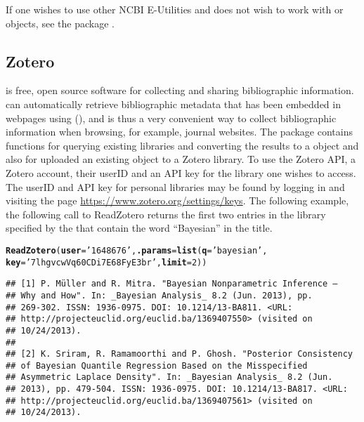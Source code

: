 \documentclass[article]{jss}\usepackage[]{graphicx}\usepackage[]{color}
\makeatletter
\newcommand{\hlnum}[1]{\textcolor[rgb]{0.125,0.125,1}{#1}}%
\newcommand{\hlstr}[1]{\textcolor[rgb]{0.125,0.125,1}{#1}}%
\newcommand{\hlstd}[1]{\textcolor[rgb]{0.251,0.251,0.282}{#1}}%
\newcommand{\hlkwc}[1]{\textcolor[rgb]{0.529,0,0.184}{\textbf{#1}}}%
\newcommand{\hlkwd}[1]{\textcolor[rgb]{0.251,0.251,0.282}{\textbf{#1}}}%
\newenvironment{kframe}{%
 \def\at@end@of@kframe{}%
 \ifinner\ifhmode%
  \def\at@end@of@kframe{\end{minipage}}%
  \begin{minipage}{\columnwidth}%
 \fi\fi%
 \def\FrameCommand##1{\hskip\@totalleftmargin \hskip-\fboxsep
 \colorbox{shadecolor}{##1}\hskip-\fboxsep
     \hskip-\linewidth \hskip-\@totalleftmargin \hskip\columnwidth}%
 \MakeFramed {\advance\hsize-\width
   \@totalleftmargin\z@ \linewidth\hsize
   \@setminipage}}%
 {\par\unskip\endMakeFramed%
 \at@end@of@kframe}
\newenvironment{knitrout}{}{} %
\newcommand{\ourpkg}{\pkg{RefManageR}}
\makeatother
\begin{document}
If one wishes to use other NCBI E-Utilities and does not wish to work with  or  objects, see the  package \citep{rentrez}.
\subsection{Zotero}
 is free, open source software for collecting and sharing bibliographic information.   can automatically retrieve bibliographic metadata that has been embedded in webpages using  (), and is thus a very convenient way to collect bibliographic information when browsing, for example, journal websites.  The \ourpkg{} package contains functions for querying existing  libraries and converting the results to a  object and also for uploaded an existing  object to a Zotero library.  To use the Zotero API, a Zotero account, their userID and an API key for the library one wishes to access.  The userID and API key for personal libraries may be found by logging in and visiting the page \url{https://www.zotero.org/settings/keys}.  The following example, the following call to ReadZotero returns the first two entries in the library specified by the  that contain the word ``Bayesian'' in the title.
\begin{knitrout}
\color{fgcolor}\begin{kframe}
\begin{alltt}
\hlkwd{ReadZotero}\hlstd{(}\hlkwc{user} \hlstd{=} \hlstr{'1648676'}\hlstd{,} \hlkwc{.params} \hlstd{=} \hlkwd{list}\hlstd{(}\hlkwc{q} \hlstd{=} \hlstr{'bayesian'}\hlstd{,}
                               \hlkwc{key} \hlstd{=} \hlstr{'7lhgvcwVq60CDi7E68FyE3br'}\hlstd{,} \hlkwc{limit} \hlstd{=} \hlnum{2}\hlstd{))}
\end{alltt}
\begin{verbatim}
## [1] P. Müller and R. Mitra. "Bayesian Nonparametric Inference –
## Why and How". In: _Bayesian Analysis_ 8.2 (Jun. 2013), pp.
## 269-302. ISSN: 1936-0975. DOI: 10.1214/13-BA811. <URL:
## http://projecteuclid.org/euclid.ba/1369407550> (visited on
## 10/24/2013).
## 
## [2] K. Sriram, R. Ramamoorthi and P. Ghosh. "Posterior Consistency
## of Bayesian Quantile Regression Based on the Misspecified
## Asymmetric Laplace Density". In: _Bayesian Analysis_ 8.2 (Jun.
## 2013), pp. 479-504. ISSN: 1936-0975. DOI: 10.1214/13-BA817. <URL:
## http://projecteuclid.org/euclid.ba/1369407561> (visited on
## 10/24/2013).
\end{verbatim}
\end{kframe}
\end{knitrout}
\end{document}
